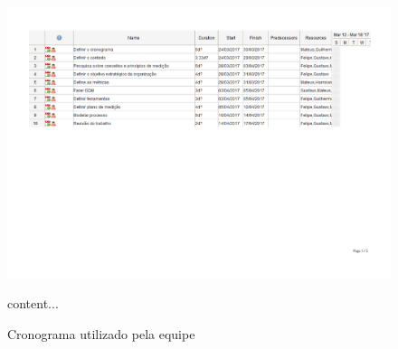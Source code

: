 	\begin{figure}[!htpb]
		\centering
		\includegraphics [scale=0.4]{figuras/processo/cronograma}
		\caption{Cronograma utilizado pela equipe}
		content...
	\end{figure}